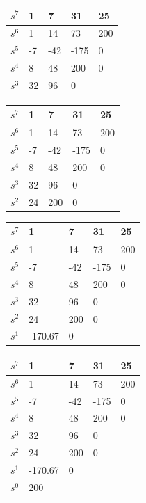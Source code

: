 \begin{center}

\begin{tabular}{ |p{1.25cm}|p{1.25cm}|p{1.25cm}|p{1.25cm}|p{1.25cm}|  }
\hline
$s^7$ & 1 & 7 & 31 & 25\\
\hline
$s^6$ & 1 & 14 & 73 & 200\\
\hline
$s^5$ & -7 & -42 & -175 & 0\\
\hline
$s^4$ & 8 & 48 & 200 & 0\\
\hline
$s^3$ & 32 & 96 & 0 &  \\
\hline
\end{tabular}

\begin{tabular}{ |p{1.25cm}|p{1.25cm}|p{1.25cm}|p{1.25cm}|p{1.25cm}|  }
\hline
$s^7$ & 1 & 7 & 31 & 25\\
\hline
$s^6$ & 1 & 14 & 73 & 200\\
\hline
$s^5$ & -7 & -42 & -175 & 0\\
\hline
$s^4$ & 8 & 48 & 200 & 0\\
\hline
$s^3$ & 32 & 96 & 0 &  \\
\hline
$s^2$ & 24 & 200 & 0 &  \\
\hline
\end{tabular}

\begin{tabular}{ |p{1.25cm}|p{1.25cm}|p{1.25cm}|p{1.25cm}|p{1.25cm}|  }
\hline
$s^7$ & 1 & 7 & 31 & 25\\
\hline
$s^6$ & 1 & 14 & 73 & 200\\
\hline
$s^5$ & -7 & -42 & -175 & 0\\
\hline
$s^4$ & 8 & 48 & 200 & 0\\
\hline
$s^3$ & 32 & 96 & 0 & \\
\hline
$s^2$ & 24 & 200 & 0 & \\
\hline
$s^1$ & -170.67 & 0 &  & \\
\hline
\end{tabular}

\begin{tabular}{ |p{1.25cm}|p{1.25cm}|p{1.25cm}|p{1.25cm}|p{1.25cm}|  }
\hline
$s^7$ & 1 & 7 & 31 & 25\\
\hline
$s^6$ & 1 & 14 & 73 & 200\\
\hline
$s^5$ & -7 & -42 & -175 & 0\\
\hline
$s^4$ & 8 & 48 & 200 & 0\\
\hline
$s^3$ & 32 & 96 & 0 & \\
\hline
$s^2$ & 24 & 200 & 0 & \\
\hline
$s^1$ & -170.67 & 0 &  & \\
\hline
$s^0$ & 200 &   &   & \\
\hline
\end{tabular}

\end{center}

